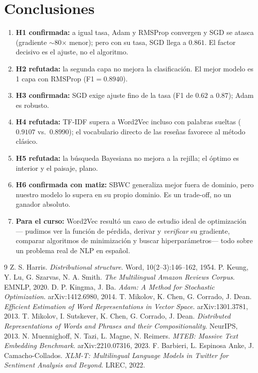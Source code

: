 \documentclass[11pt]{article}
\begin{document}
\section{Conclusiones}\label{sec:conclusiones}
\begin{enumerate}
  \item \textbf{H1 confirmada:} a igual tasa, Adam y RMSProp convergen y SGD se atasca
  (gradiente $\sim$80$\times$ menor); pero con su tasa, SGD llega a $0.861$. El factor decisivo
  es el ajuste, no el algoritmo.
  \item \textbf{H2 refutada:} la segunda capa no mejora la clasificación. El mejor modelo es
  1 capa con RMSProp (F1$=0.8940$).
  \item \textbf{H3 confirmada:} SGD exige ajuste fino de la tasa (F1 de $0.62$ a $0.87$); Adam
  es robusto.
  \item \textbf{H4 refutada:} TF-IDF supera a Word2Vec incluso con palabras sueltas ($0.9107$
  vs.\ $0.8990$); el vocabulario directo de las reseñas favorece al método clásico.
  \item \textbf{H5 refutada:} la búsqueda Bayesiana no mejora a la rejilla; el óptimo es
  interior y el paisaje, plano.
  \item \textbf{H6 confirmada con matiz:} SBWC generaliza mejor fuera de dominio, pero nuestro
  modelo lo supera en su propio dominio. Es un trade-off, no un ganador absoluto.
  \item \textbf{Para el curso:} Word2Vec resultó un caso de estudio ideal de optimización ---
  pudimos ver la función de pérdida, derivar y \emph{verificar} su gradiente, comparar
  algoritmos de minimización y buscar hiperparámetros--- todo sobre un problema real de NLP en
  español.
\end{enumerate}

\begin{thebibliography}{9}
 Z. S. Harris. \emph{Distributional structure}. Word, 10(2--3):146--162, 1954.
 P. Keung, Y. Lu, G. Szarvas, N. A. Smith. \emph{The Multilingual Amazon Reviews Corpus}. EMNLP, 2020.
 D. P. Kingma, J. Ba. \emph{Adam: A Method for Stochastic Optimization}. arXiv:1412.6980, 2014.
 T. Mikolov, K. Chen, G. Corrado, J. Dean. \emph{Efficient Estimation of Word Representations in Vector Space}. arXiv:1301.3781, 2013.
 T. Mikolov, I. Sutskever, K. Chen, G. Corrado, J. Dean. \emph{Distributed Representations of Words and Phrases and their Compositionality}. NeurIPS, 2013.
 N. Muennighoff, N. Tazi, L. Magne, N. Reimers. \emph{MTEB: Massive Text Embedding Benchmark}. arXiv:2210.07316, 2023.
 F. Barbieri, L. Espinosa Anke, J. Camacho-Collados. \emph{XLM-T: Multilingual Language Models in Twitter for Sentiment Analysis and Beyond}. LREC, 2022.
\end{thebibliography}
\end{document}
